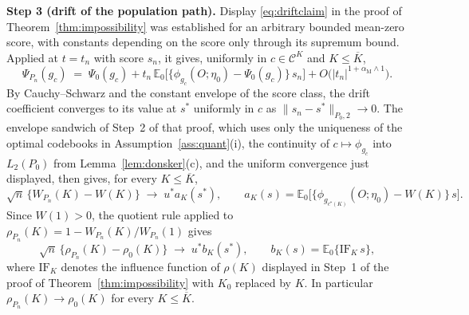 \documentclass[11pt]{article}
\newcommand{\E}{\mathbb E}
\newcommand{\calC}{\mathcal C}
\newcommand{\norm}[1]{\lVert #1\rVert}
\newcommand{\am}{\alpha_{\mathrm M}}
\begin{document}
\textbf{Step 3 (drift of the population path).} Display \eqref{eq:driftclaim} in the proof of Theorem~\ref{thm:impossibility} was established for an arbitrary bounded mean-zero score, with constants depending on the score only through its supremum bound. Applied at $t=t_n$ with score $s_n$, it gives, uniformly in $c\in\calC^K$ and $K\le\overline K$,
\begin{equation*}
\Psi_{P_n}(g_c)\;=\;\Psi_0(g_c)+t_n\,\E_0\bigl[\{\phi_{g_c}(O;\eta_0)-\Psi_0(g_c)\}\,s_n\bigr]+O\bigl(|t_n|^{1+\am\wedge1}\bigr).
\end{equation*}
By Cauchy--Schwarz and the constant envelope of the score class, the drift coefficient converges to its value at $s^\ast$ uniformly in $c$ as $\norm{s_n-s^\ast}_{P_0,2}\to0$. The envelope sandwich of Step~2 of that proof, which uses only the uniqueness of the optimal codebooks in Assumption~\ref{ass:quant}\textup{(i)}, the continuity of $c\mapsto\phi_{g_c}$ into $L_2(P_0)$ from Lemma~\ref{lem:donsker}(c), and the uniform convergence just displayed, then gives, for every $K\le\overline K$,
\begin{equation}\label{eq:Wdrifthonest}
\sqrt n\,\{W_{P_n}(K)-W(K)\}\;\longrightarrow\;u^\ast a_K(s^\ast),
\qquad
a_K(s)=\E_0\bigl[\{\phi_{g_{c^\star(K)}}(O;\eta_0)-W(K)\}\,s\bigr].
\end{equation}
Since $W(1)>0$, the quotient rule applied to $\rho_{P_n}(K)=1-W_{P_n}(K)/W_{P_n}(1)$ gives
\begin{equation}\label{eq:rhodrifthonest}
\sqrt n\,\{\rho_{P_n}(K)-\rho_0(K)\}\;\longrightarrow\;u^\ast b_K(s^\ast),
\qquad
b_K(s)=\E_0\{\mathrm{IF}_K\,s\},
\end{equation}
where $\mathrm{IF}_K$ denotes the influence function of $\rho(K)$ displayed in Step~1 of the proof of Theorem~\ref{thm:impossibility} with $K_0$ replaced by $K$. In particular $\rho_{P_n}(K)\to\rho_0(K)$ for every $K\le\overline K$.
\end{document}
